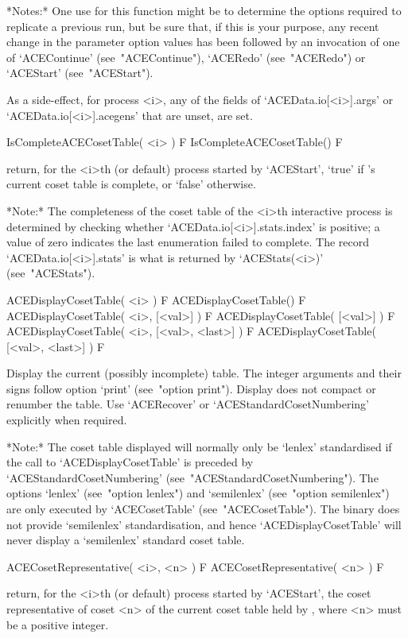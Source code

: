 *Notes:*
One use for this function might be to determine the  options  required
to replicate a previous run,  but  be  sure  that,  if  this  is  your
purpose, any recent change in the parameter  option  values  has  been
followed by an invocation of one of `ACEContinue' (see~"ACEContinue"),
`ACERedo' (see~"ACERedo") or `ACEStart' (see~"ACEStart").

As a side-effect, for  {\ACE}  process  <i>,  any  of  the  fields  of
`ACEData.io[<i>].args' or `ACEData.io[<i>].acegens'  that  are  unset,
are set.

\>IsCompleteACECosetTable( <i> ) F
\>IsCompleteACECosetTable() F

return, for the <i>th (or  default)  process  started  by  `ACEStart',
`true' if  {\ACE}'s  current  coset  table  is  complete,  or  `false'
otherwise.

*Note:*
The completeness of the coset table of the  <i>th  interactive  {\ACE}
process      is       determined       by       checking       whether
`ACEData.io[<i>].stats.index' is positive; a value of  zero  indicates
the   last   enumeration    failed    to    complete.    The    record
`ACEData.io[<i>].stats'  is  what  is  returned   by   `ACEStats(<i>)'
(see~"ACEStats").

\>ACEDisplayCosetTable( <i> ) F
\>ACEDisplayCosetTable() F
\>ACEDisplayCosetTable( <i>, [<val>] ) F
\>ACEDisplayCosetTable( [<val>] ) F
\>ACEDisplayCosetTable( <i>, [<val>, <last>] ) F
\>ACEDisplayCosetTable( [<val>, <last>] ) F

Display the current (possibly incomplete) table. The integer arguments and
their signs follow option `print' (see~"option print"). Display does not
compact or renumber the table. Use `ACERecover' or
`ACEStandardCosetNumbering' explicitly when required.

*Note:*
The coset table displayed will normally only be `lenlex'  standardised
if   the   call   to    `ACEDisplayCosetTable'    is    preceded    by
`ACEStandardCosetNumbering'   (see~"ACEStandardCosetNumbering").   The
options `lenlex' (see~"option lenlex") and  `semilenlex'  (see~"option
semilenlex")     are     only     executed     by      `ACECosetTable'
(see~"ACECosetTable"). The {\ACE} binary does not provide `semilenlex'
standardisation, and hence `ACEDisplayCosetTable' will never display a
`semilenlex' standard coset table.

\>ACECosetRepresentative( <i>, <n> ) F
\>ACECosetRepresentative( <n> ) F

return, for the <i>th (or default) process started by `ACEStart',  the
coset representative of coset <n> of the current coset table  held  by
{\ACE}, where <n> must be a positive integer.

